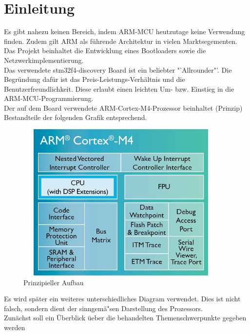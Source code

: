 \chapter{Einleitung}

Es gibt nahezu keinen Bereich, indem ARM-MCU heutzutage keine Verwendung finden. 
Zudem gilt ARM als f\"uhrende Architektur in vielen Marktsegementen.\\ 
Das Projekt beinhaltet die Entwicklung eines Bootloaders sowie die
 Netzwerkimplementierung.\\
Das verwendete stm32f4-discovery Board ist ein beliebter "'Allrounder"'.
Die Begr\"undung daf\"ur ist das Preis-Leistungs-Verh\"altnis und die
Benutzerfreundlichkeit. Diese erlaubt einen leichten Um- bzw. Einstieg in
die ARM-MCU-Programmierung.\\
Der auf dem Board verwendete ARM-Cortex-M4-Prozessor beinhaltet (Prinzip)
Bestandteile der folgenden Grafik entsprechend.\\
\begin{figure}[ht]
	\centering
	\includegraphics[width=400px, height=300px]{../img/Cortex-M4-chip-diagram-LG.png}
	\caption{Prinzipieller Aufbau}
	\label{m4_prinzip}
\end{figure}

Es wird sp\"ater ein weiteres unterschiedliches Diagram verwendet. Dies ist nicht
falsch, sondern dient der sinngem\"a"sen Darstellung des Prozessors.\\

Zun\"achst soll ein \"Uberblick \"ueber die behandelten Themenschwerpunkte gegeben
 werden

